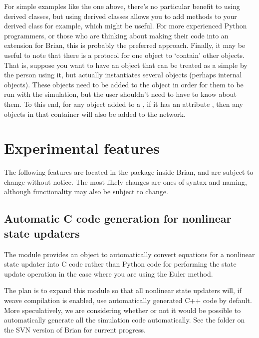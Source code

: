 \documentclass[letterpaper,10pt,english]{manual}
\begin{document}
For simple examples like the one above, there's no particular benefit to
using derived classes, but using derived classes allows you to add
methods to your derived class for example, which might be useful. For
more experienced Python programmers, or those who are thinking about
making their code into an extension for Brian, this is probably the
preferred approach.
Finally, it may be useful to note that there is a protocol for one object
to `contain' other objects. That is, suppose you want to have an object
that can be treated as a simple \hyperlink{brian.NeuronGroup}{} by the person using it,
but actually instantiates several objects (perhaps internal \hyperlink{brian.Connection}{}
objects). These objects need to be added to the \hyperlink{brian.Network}{} object
in order for them to be run with the simulation, but the user shouldn't need
to have to know about them. To this end, for any object added to a
\hyperlink{brian.Network}{}, if it has an attribute , then any
objects in that container will also be added to the network.

\resetcurrentobjects
\hypertarget{--doc-experimental}{}

\chapter{Experimental features}

The following features are located in the  package inside Brian, and are subject to change
without notice. The most likely changes are ones of syntax and naming, although functionality may also
be subject to change.

\resetcurrentobjects
\hypertarget{--doc-experimental-ccodegen}{}

\hypertarget{ccodegen}{}\section{Automatic C code generation for nonlinear state updaters}

The  module provides an object 
to automatically convert equations for a nonlinear state updater into C code rather than Python code
for performing the state update operation in the case where you are using the Euler method.

The plan is to expand this module so that all nonlinear state updaters will, if weave compilation is
enabled, use automatically generated C++ code by default. More speculatively, we are considering
whether or not it would be possible to automatically generate all the simulation code automatically.
See the  folder on the SVN version of Brian for current progress.
\end{document}
